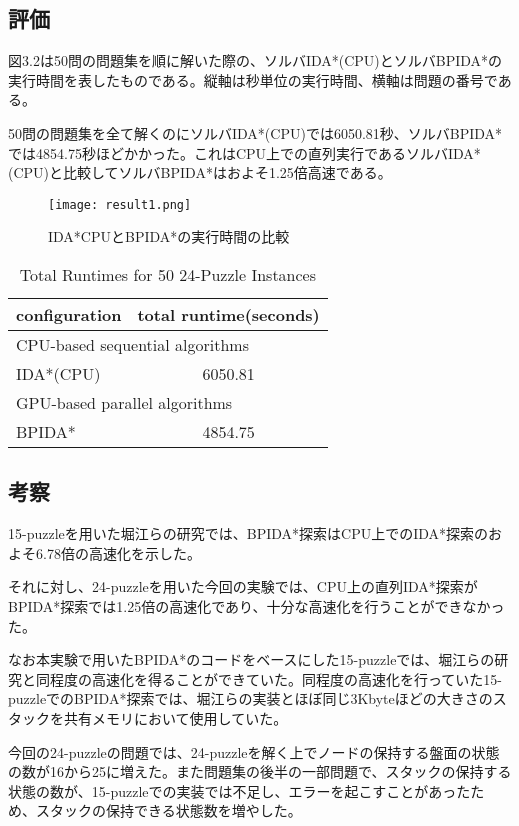 \documentclass[a4paper,11pt,oneside,openany]{jsbook}
\begin{document}
\subsection{評価}
図3.2は50問の問題集を順に解いた際の、ソルバIDA*(CPU)とソルバBPIDA*の実行時間を表したものである。縦軸は秒単位の実行時間、横軸は問題の番号である。

50問の問題集を全て解くのにソルバIDA*(CPU)では6050.81秒、ソルバBPIDA*では4854.75秒ほどかかった。これはCPU上での直列実行であるソルバIDA*(CPU)と比較してソルバBPIDA*はおよそ1.25倍高速である。


\begin{figure}[hbtp]
\begin{center}
\texttt{[image: result1.png]}
\caption{IDA*CPUとBPIDA*の実行時間の比較}
\end{center}
\end{figure}

\begin{table}[hbtp]
\centering
\caption{Total Runtimes for 50 24-Puzzle Instances}
\label{my-label}
\begin{tabular}{|l|c|}
\hline
configuration & \multicolumn{1}{l|}{total runtime(seconds)} \\ \hline
\multicolumn{2}{|l|}{CPU-based sequential algorithms} \\ \hline
IDA*(CPU) & 6050.81 \\ \hline
\multicolumn{2}{|l|}{GPU-based parallel algorithms} \\ \hline
BPIDA* & 4854.75 \\ \hline
\end{tabular}
\end{table}


\subsection{考察}
15-puzzleを用いた堀江らの研究\cite{HA17}では、BPIDA*探索はCPU上でのIDA*探索のおよそ6.78倍の高速化を示した。

それに対し、24-puzzleを用いた今回の実験では、CPU上の直列IDA*探索がBPIDA*探索では1.25倍の高速化であり、十分な高速化を行うことができなかった。

なお本実験で用いたBPIDA*のコードをベースにした15-puzzleでは、堀江らの研究と同程度の高速化を得ることができていた。同程度の高速化を行っていた15-puzzleでのBPIDA*探索では、堀江らの実装とほぼ同じ3Kbyteほどの大きさのスタックを共有メモリにおいて使用していた。

今回の24-puzzleの問題では、24-puzzleを解く上でノードの保持する盤面の状態の数が16から25に増えた。また問題集の後半の一部問題で、スタックの保持する状態の数が、15-puzzleでの実装では不足し、エラーを起こすことがあったため、スタックの保持できる状態数を増やした。
\end{document}
